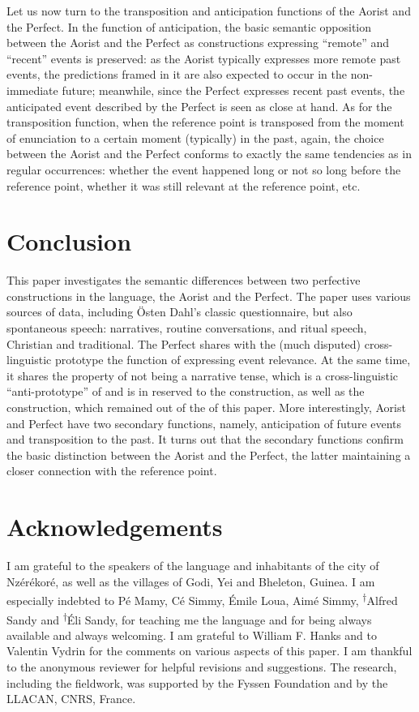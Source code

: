 \documentclass[output=paper,newtxmath,modfonts,nonflat,hidelinks]{langsci/langscibook}
\begin{document}
Let us now turn to the transposition and anticipation functions of the Aorist and the Perfect. In the function of anticipation, the basic semantic opposition between the Aorist and the Perfect as constructions expressing ``remote'' and ``recent'' events is preserved: as the Aorist typically expresses more remote past events, the predictions framed in it are also expected to occur in the non-imme\-di\-ate future; meanwhile, since the Perfect expresses recent past events, the anticipated event described by the Perfect is seen as close at hand. As for the transposition function, when the reference point is transposed from the moment of enunciation to a certain moment (typically) in the past, again, the choice between the Aorist and the Perfect conforms to exactly the same tendencies as in regular occurrences: whether the  event happened long or not so long before the reference point, whether it was still relevant at the reference point, etc.

\section{Conclusion}
This paper investigates the semantic differences between two perfective constructions in the  language, the Aorist and the Perfect. The paper uses various sources of data, including Östen Dahl's classic questionnaire, but also spontaneous speech: narratives, routine conversations, and ritual speech, Christian and traditional. The  Perfect shares with the (much disputed) cross-linguistic prototype the function of expressing event relevance. At the same time, it shares the property of not being a narrative tense, which is a cross-linguistic ``anti-prototype'' of  and is in  reserved to the  construction, as well as the  construction, which remained out of the  of this paper. More interestingly,  Aorist and Perfect have two secondary functions, namely, anticipation of future events and transposition to the past. It turns out that the secondary functions confirm the basic distinction between the Aorist and the Perfect, the latter maintaining a closer connection with the reference point.


\section*{Acknowledgements}

I am grateful to the speakers of the  language and inhabitants of the city of Nzérékoré, as well as the villages of Godi, Yei and Bheleton, Guinea. I am especially indebted to Pé Mamy, Cé Simmy, Émile Loua, Aimé Simmy, \textsuperscript{†}Alfred Sandy and \textsuperscript{†}Éli Sandy, for teaching me the language and for being always available and always welcoming. I am grateful to William F. Hanks and to Valentin Vydrin for the comments on various aspects of this paper. I am thankful to the anonymous reviewer for helpful revisions and suggestions. The research, including the fieldwork, was supported by the Fyssen Foundation and by the LLACAN, CNRS, France.
\end{document}
